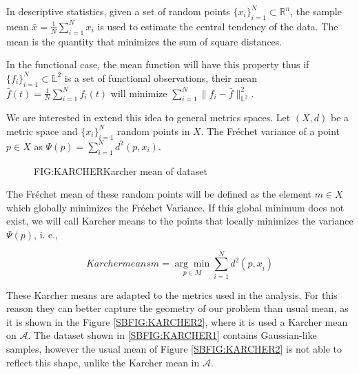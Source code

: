 In descriptive statistics, given a set of random points
$\{x_i\}_{i=1}^{N} \subset \mathbb{R}^n$, the sample mean
$\bar x = \frac{1}{N}\sum_{i=1}^{N} x_i$ is used to estimate the central
tendency of the data. The mean is the quantity that minimizes the sum of square distances.

In the functional case, the mean function will have this property thus if
$\{f_i\}_{i=1}^{N} \subset \mathbb{L}^2$ is a set of functional observations,
their mean $\bar f(t) = \frac{1}{N}\sum_{i=1}^{N} f_i(t)$ will minimize
$\sum_{i=1}^{N}\|f_i - \bar f\|_{\mathbb{L}^2}^2$.

We are interested in extend this idea to general metrics spaces.
Let $(X, d)$ be a metric space and $\{x_i\}_{i=1}^{N}$ random points in $X$.
The Fréchet variance of a point $p \in X$ as $\Psi(p)=\sum_{i=1}^{N} d^{2}\left(p, x_{i}\right)$.

\begin{figure}[Karcher mean of dataset]{FIG:KARCHER}{Karcher mean of dataset}
	 \quad
	 \\
	 \quad
\end{figure}

The Fréchet mean of these random points will be defined as the element $m \in X$
which globally minimizes the Fréchet Variance. If this global minimum does not
exist, we will call Karcher means to the points that locally minimizes the variance
$\Psi(p)$, i. e.,

\begin{equation}[]{Karcher means}
m=\underset{p \in M}{\arg \min } \sum_{i=1}^{N} d^{2}\left(p, x_{\dot{i}}\right)
\end{equation}

These Karcher means are adapted to the metrics used in the analysis. For this reason they can better capture the geometry of our problem
than usual mean, as it is shown in the Figure \ref{SBFIG:KARCHER2}, where it is
used a Karcher mean on $\mathscr{A}$.
The dataset shown in \ref{SBFIG:KARCHER1} contains Gaussian-like
samples, however the usual mean of Figure \ref{SBFIG:KARCHER2} is not able to reflect
this shape, unlike the Karcher mean in $\mathscr{A}$.



